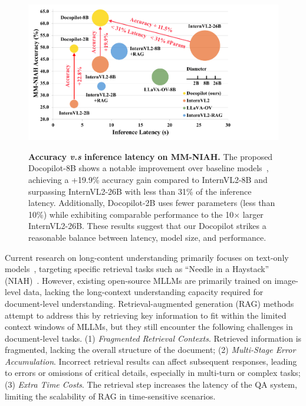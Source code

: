 \documentclass[10pt,twocolumn,letterpaper]{article}
\def\modelname{Docopilot\xspace}
\begin{document}
\begin{CJK}{UTF8}{gbsn}
\begin{figure}[t!]
    \centering
    {\includegraphics[width=\linewidth]{figure/teaser.pdf}}
    \caption{\textbf{Accuracy \emph{v.s} inference latency on MM-NIAH.} 
    The proposed \modelname-8B shows a notable improvement over baseline models~\cite{InternVL2}, achieving a +19.9\% accuracy gain compared to InternVL2-8B and surpassing InternVL2-26B with less than 31\% of the inference latency. Additionally, \modelname-2B uses fewer parameters (less than 10\%) while exhibiting comparable performance to the 10$\times$ larger InternVL2-26B. These results suggest that our \modelname strikes a reasonable balance between latency, model size, and performance.}
    \label{fig:teaser}
    \vspace{-3mm}
\end{figure}

Current research on long-content understanding primarily focuses on text-only models~\cite{qwen, qwen2.5, cai2024internlm2}, targeting specific retrieval tasks such as ``Needle in a Haystack'' (NIAH)~\cite{an2023leval, LLMTest_NeedleInAHaystack}.
However, existing open-source MLLMs \cite{chen2023internvl, wang2024qwen2vl, li2024llavaonevision, chen2024far, liu2023improved,shi2024eagle,wang2024allseeingv2} are primarily trained on image-level data, lacking the long-context understanding capacity required for document-level understanding.
Retrieval-augmented generation (RAG) methods~\cite{yu2024visrag, cho2024m3docrag,faysse2024colpali,ma2024unifying,sharifymoghaddam2024unirag,shi2023replug} attempt to address this by retrieving key information to fit within the limited context windows of MLLMs, but they still encounter the following challenges in document-level tasks.
(1) \emph{Fragmented Retrieval Contexts}. Retrieved information is fragmented, lacking the overall structure of the document; 
(2) \emph{Multi-Stage Error Accumulation}. Incorrect retrieval results can affect subsequent responses, leading to errors or omissions of critical details, especially in multi-turn or complex tasks;
(3) \emph{Extra Time Costs}. The retrieval step increases the latency of the QA system, limiting the scalability of RAG in time-sensitive scenarios.




\end{CJK}
\end{document}
